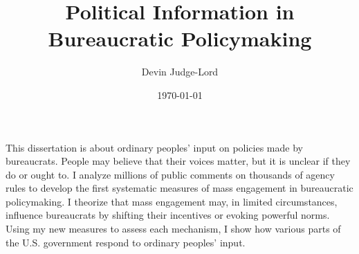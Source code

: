 \documentclass{article}
\title{Political Information in Bureaucratic Policymaking}
\author{Devin Judge-Lord} %
\date{\today}
\begin{document}
\maketitle

This dissertation is about ordinary peoples' input on policies made by bureaucrats. People may believe that their voices matter, but it is unclear if they do or ought to. I analyze millions of public comments on thousands of agency rules to develop the first systematic measures of mass engagement in bureaucratic policymaking. I theorize that mass engagement may, in limited circumstances, influence bureaucrats by shifting their incentives or evoking powerful norms. Using my new measures to assess each mechanism, I show how various parts of the U.S. government respond to ordinary peoples' input.  %
\end{document}
